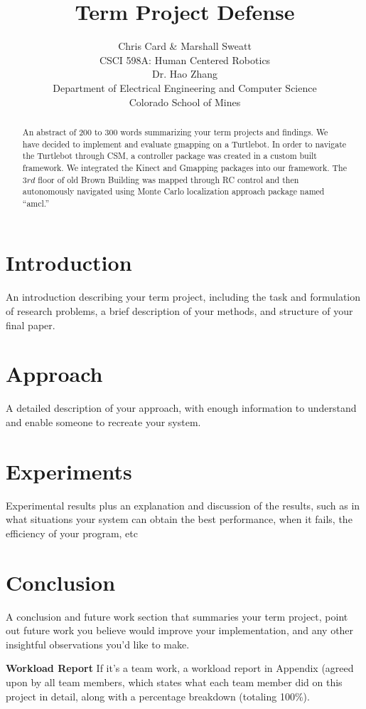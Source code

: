 \documentclass[10pt]{article}
\title{Term Project Defense}
\author{Chris Card \& Marshall Sweatt\\
CSCI 598A: Human Centered Robotics\\
Dr. Hao Zhang\\
Department of Electrical Engineering and Computer Science\\
Colorado School of Mines}
\begin{document}
\maketitle
\newpage

\begin{abstract}
{\color{red} An abstract of 200 to 300 words summarizing your term projects and findings.} 
We have decided to implement and evaluate gmapping on a Turtlebot.  In order to navigate the Turtlebot through CSM, a controller package was created in a custom built framework.  We integrated the Kinect and Gmapping packages into our framework.  The 3${rd}$ floor of old Brown Building was mapped through RC control and then autonomously navigated using Monte Carlo localization approach package named ``amcl.''
\end{abstract}

\section{Introduction}
{\color{red} An introduction describing
your term project, including the task
and formulation of research problems, a brief description of your methods, and structure of your final paper.}

\section{Approach}
{\color{red}A detailed description of your approach, with enough information to understand
and enable someone to recreate your system.}

\section{Experiments}
{\color{red}Experimental results plus an explanation and discussion of the results, such as in what situations your system can obtain the best performance, when it fails, the efficiency of your program, etc}


\section{Conclusion}
{\color{red}A conclusion and future work section that summaries your term project, point out future work you believe would improve your implementation, and any other insightful observations you’d like to make.}

\appendix
\textbf{Workload Report}
{\color{red} If it’s a team work, a workload report in Appendix (agreed upon by all team members, which states what each team member did on this project in detail, along with a percentage breakdown (totaling 100\%).}
\end{document}
